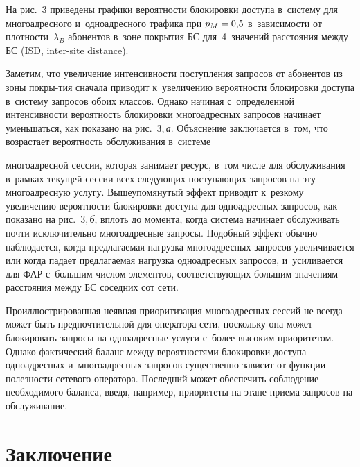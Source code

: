 \begin{multicols}{2}
  На рис.~3 приведены графики ве\-ро\-ят\-ности блокировки доступа в~сис\-те\-му 
для многоадресного и~одноадресного трафика при $p_M\hm= 0{,}5$ 
в~за\-ви\-си\-мости от плот\-ности~$\lambda_B$ абонентов в~зоне покрытия БС 
для~4~значений рас\-сто\-яния меж\-ду БС (ISD, inter-site distance). 
  

  Заметим, что увеличение ин\-тен\-сив\-ности по\-ступ\-ле\-ния запросов от 
абонентов из зоны покры-\linebreak тия сначала приводит к~увеличению ве\-ро\-ят\-ности\linebreak 
блокировки доступа в~сис\-те\-му запросов обоих классов. Однако начиная 
с~определенной ин\-тен\-сив\-ности ве\-ро\-ят\-ность блокировки многоадресных 
запросов начинает уменьшаться, как показано на рис.~3,\,\textit{а}. Объяснение 
заключается в~том, что воз\-рас\-та\-ет ве\-ро\-ят\-ность обслуживания в~сис\-те\-ме\linebreak\vspace*{-12pt}

\pagebreak

\noindent
 многоадресной сессии, которая занимает ресурс,
 в~том чис\-ле для обслуживания 
в~рамках текущей сессии всех сле\-ду\-ющих по\-сту\-па\-ющих запросов на эту 
многоадресную услугу. Вышеупомянутый эффект
 приводит к~резкому 
увеличению ве\-ро\-ят\-ности блокировки доступа для одноадресных запросов, как 
показано на рис.~3,\,\textit{б}, вплоть до момента, когда сис\-те\-ма начинает 
обслуживать почти исключительно многоадресные запросы. Подобный эффект 
обычно наблюдается, когда пред\-ла\-га\-емая нагрузка многоадресных запросов 
увеличивается или когда падает пред\-ла\-га\-емая нагрузка одноадресных запросов, 
и~усиливается для ФАР с~большим чис\-лом элементов, со\-от\-вет\-ст\-ву\-ющих 
большим значениям рас\-сто\-яния между БС соседних сот сети.
  
  Проиллюстрированная неявная приоритизация многоадресных сессий не 
всегда может быть предпочтительной для оператора сети, поскольку она может 
блокировать запросы на одноадресные услуги с~более высоким приоритетом. 
Однако фактический баланс между вероятностями блокировки доступа 
одноадресных и~многоадресных запросов существенно зависит от функции 
по\-лез\-ности сетевого оператора. Последний может обеспечить соблюдение 
необходимого баланса,  введя, например, приоритеты на этапе приема запросов 
на обслуживание.
  
\section{Заключение}


\end{multicols}
